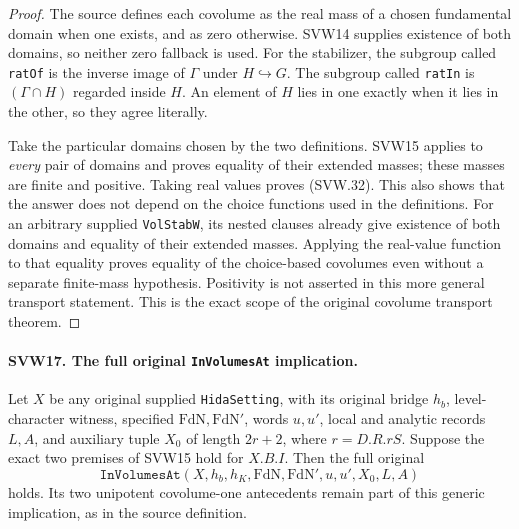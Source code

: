 \begin{proof}
The source defines each covolume as the real mass of a chosen
fundamental domain when one exists, and as zero otherwise.
SVW14 supplies existence of both domains, so neither zero fallback
is used.  For the stabilizer, the subgroup called \texttt{ratOf}
is the inverse image of $\Gamma$ under $H\hookrightarrow G$.
The subgroup called \texttt{ratIn} is $(\Gamma\cap H)$ regarded
inside $H$.  An element of $H$ lies in one exactly when it lies
in the other, so they agree literally.

Take the particular domains chosen by the two definitions.
SVW15 applies to \emph{every} pair of domains and proves equality
of their extended masses; these masses are finite and positive.
Taking real values proves (SVW.32).  This also shows that the
answer does not depend on the choice functions used in the
definitions.  For an arbitrary supplied \texttt{VolStabW}, its
nested clauses already give existence of both domains and equality
of their extended masses.  Applying the real-value function to
that equality proves equality of the choice-based covolumes even
without a separate finite-mass hypothesis.  Positivity is not
asserted in this more general transport statement.  This is the
exact scope of the original covolume transport theorem.
\end{proof}

\paragraph{SVW17. The full original \texttt{InVolumesAt} implication.}
\label{claim:SVW17}
Let $X$ be any original supplied \texttt{HidaSetting}, with its
original bridge $h_b$, level-character witness, specified
$\mathrm{FdN},\mathrm{FdN}'$, words $u,u'$, local and analytic
records $L,A$, and auxiliary tuple $X_0$ of length $2r+2$, where
$r=D.R.rS$.  Suppose the exact two premises of SVW15 hold for
$X.B.I$.  Then the full original
\[
 \texttt{InVolumesAt}(X,h_b,h_K,\mathrm{FdN},\mathrm{FdN}',
                                    u,u',X_0,L,A)
 \tag{SVW.33}
\]
holds.  Its two unipotent covolume-one antecedents remain part of
this generic implication, as in the source definition.

